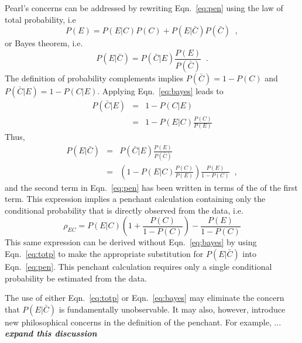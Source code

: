 \documentclass[a4paper,11pt,twocolumn]{article}
\begin{document}
Pearl's concerns can be addressed by rewriting Eqn.\ \ref{eq:pen} using the law of total probability, i.e
\begin{equation}
\label{eq:totp}
P(E) = P(E|C)P(C) + P(E|\bar{C})P(\bar{C})\;\;,
\end{equation}
or Bayes theorem, i.e.\ 
\begin{equation}
\label{eq:bayes}
P(E|\bar{C}) = P(\bar{C}|E)\frac{P(E)}{P(\bar{C})}\;\;.
\end{equation}
The definition of probability complements implies $P(\bar{C}) = 1-P(C)$ and $P(\bar{C}|E) = 1-P(C|E)$.  Applying Eqn.\ \ref{eq:bayes} leads to
\begin{eqnarray*}
P(\bar{C}|E) &=& 1-P(C|E)\\
&=& 1-P(E|C)\frac{P(C)}{P(E)}
\end{eqnarray*}
Thus,
\begin{eqnarray*}
P(E|\bar{C}) &=& P(\bar{C}|E)\frac{P(E)}{P(\bar{C})}\\
&=&\left(1-P(E|C)\frac{P(C)}{P(E)}\right)\frac{P(E)}{1-P(C)}\;\;,
\end{eqnarray*}
and the second term in Eqn.\ \ref{eq:pen} has been written in terms of the of the first term.  This expression implies a penchant calculation containing only the conditional probability that is directly observed from the data, i.e.\
\begin{equation}
\label{eq:pencal}
\rho_{EC} = P(E|C)\left(1+\frac{P(C)}{1-P(C)}\right)-\frac{P(E)}{1-P(C)}
\end{equation}
This same expression can be derived without Eqn.\ \ref{eq:bayes} by using Eqn.\ \ref{eq:totp} to make the appropriate substitution for $P(E|\bar{C})$ into Eqn.\ \ref{eq:pen}.  This penchant calculation requires only a single conditional probability be estimated from the data.

The use of either Eqn.\ \ref{eq:totp} or Eqn.\ \ref{eq:bayes} may eliminate the concern that $P(E|\bar{C})$ is fundamentally unobservable.  It may also, however, introduce new philosophical concerns in the definition of the penchant.  For example, $\ldots$ {\em {\bf expand this discussion}}
\end{document}
